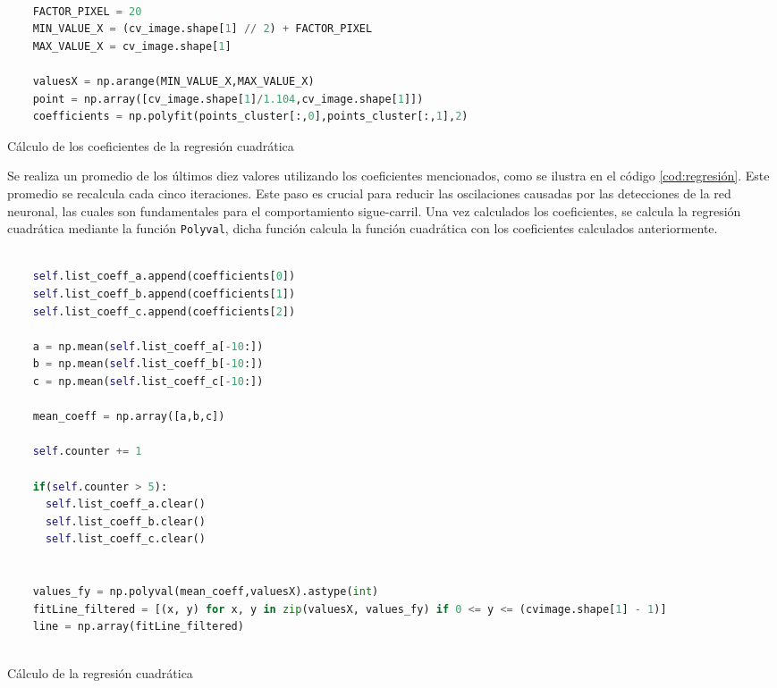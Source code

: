 \begin{code}[H]
  \begin{lstlisting}[language=Python]
  
    FACTOR_PIXEL = 20
    MIN_VALUE_X = (cv_image.shape[1] // 2) + FACTOR_PIXEL
    MAX_VALUE_X = cv_image.shape[1]
  
    valuesX = np.arange(MIN_VALUE_X,MAX_VALUE_X) 
    point = np.array([cv_image.shape[1]/1.104,cv_image.shape[1]])
    coefficients = np.polyfit(points_cluster[:,0],points_cluster[:,1],2)
  \end{lstlisting}
  \caption[Calculo de los coeficientes]{Cálculo de los coeficientes de la regresión cuadrática}
  \label{cod:Calculocoeficientes}
  \vspace{-1.5em}
  \end{code}  
Se realiza un promedio de los últimos diez valores utilizando los coeficientes mencionados, como se ilustra en el código \ref{cod:regresión}. Este promedio se recalcula 
cada cinco iteraciones. Este paso es crucial para reducir las oscilaciones causadas por las detecciones de la red neuronal, las cuales son fundamentales para el comportamiento sigue-carril. Una vez calculados los 
coeficientes, se calcula la regresión cuadrática mediante la función \texttt{Polyval}, dicha función calcula
la función cuadrática con los coeficientes calculados anteriormente. 

\begin{code}[H]
  \begin{lstlisting}[language=Python]

    self.list_coeff_a.append(coefficients[0])
    self.list_coeff_b.append(coefficients[1])
    self.list_coeff_c.append(coefficients[2])

    a = np.mean(self.list_coeff_a[-10:])
    b = np.mean(self.list_coeff_b[-10:])
    c = np.mean(self.list_coeff_c[-10:])

    mean_coeff = np.array([a,b,c])

    self.counter += 1

    if(self.counter > 5):
      self.list_coeff_a.clear()
      self.list_coeff_b.clear()
      self.list_coeff_c.clear()  


    values_fy = np.polyval(mean_coeff,valuesX).astype(int)
    fitLine_filtered = [(x, y) for x, y in zip(valuesX, values_fy) if 0 <= y <= (cvimage.shape[1] - 1)]
    line = np.array(fitLine_filtered)
   

  \end{lstlisting}
  \caption[Cálculo de la regresión cuadrática]{Cálculo de la regresión cuadrática}
  \label{cod:regresión}
  \end{code} 

